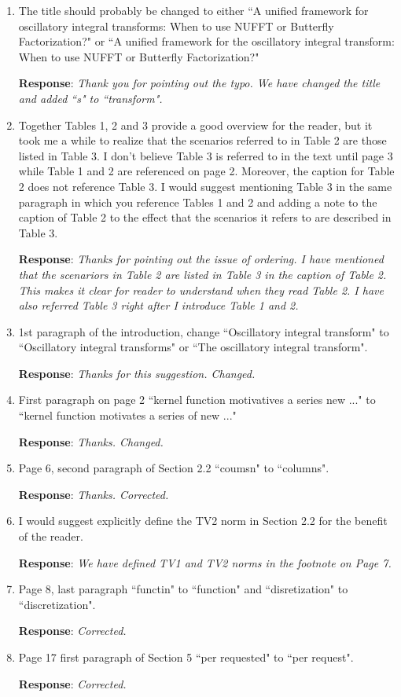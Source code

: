 \documentclass[11pt]{article}
\newcommand{\Response}{{\bf Response}}
\begin{document}
\begin{enumerate}

\item The title should probably be changed to either ``A unified framework for oscillatory integral transforms: When to use NUFFT or Butterfly Factorization?" or ``A unified framework for the oscillatory integral transform: When to use NUFFT or Butterfly Factorization?"

\Response: {\it Thank you for pointing out the typo. We have changed the title and added ``s" to ``transform".}

\item Together Tables 1, 2 and 3 provide a good overview for the reader, but it took me a while to realize that the scenarios referred to in Table 2 are those listed in Table 3. I don't believe Table 3 is referred to in the text until page 3 while Table 1 and 2 are
referenced on page 2. Moreover, the caption for Table 2 does not reference Table 3. I would suggest mentioning Table 3 in the same paragraph in which you reference Tables 1 and 2 and adding a note to the caption of Table 2 to the effect that the scenarios it
refers to are described in Table 3.

\Response: {\it Thanks for pointing out the issue of ordering. I have mentioned that the scenariors in Table 2 are listed in Table 3 in the caption of Table 2. This makes it clear for reader to understand when they read Table 2. I have also referred Table 3 right after I introduce Table 1 and 2.}

\item 1st paragraph of the introduction, change ``Oscillatory integral transform" to ``Oscillatory integral transforms" or ``The oscillatory integral transform".

\Response: {\it Thanks for this suggestion. Changed. }

\item First paragraph on page 2 ``kernel function motivatives a series new ..." to ``kernel
function motivates a series of new ..."

\Response: {\it Thanks. Changed. }

\item Page 6, second paragraph of Section 2.2  ``coumsn" to ``columns".


\Response: {\it Thanks. Corrected. }

\item I would suggest explicitly define the TV2 norm in Section 2.2 for the benefit of the reader.

\Response: {\it We have defined TV1 and TV2 norms in the footnote on Page 7. }

\item Page 8, last paragraph ``functin" to ``function" and ``disretization" to ``discretization".

\Response:{ \it Corrected. }

\item Page 17 first paragraph of Section 5 ``per requested" to ``per request".

\Response:{ \it Corrected. }

\end{enumerate}
\end{document}
